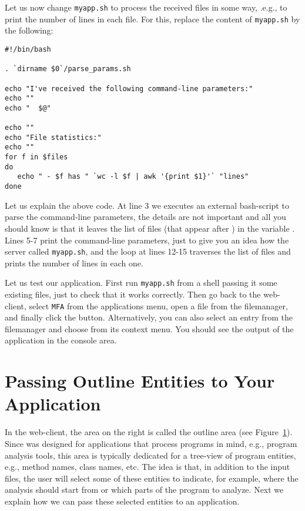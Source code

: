 Let us now change \texttt{myapp.sh} to process the received files in
some way, .e.g., to print the number of lines in each file. For this,
replace the content of \texttt{myapp.sh} by the following:

\medskip
\begin{lstlisting}[style=script]
#!/bin/bash

. `dirname $0`/parse_params.sh

echo "I've received the following command-line parameters:"
echo ""
echo "  $@"

echo ""
echo "File statistics:"
echo ""
for f in $files 
do
   echo " - $f has " `wc -l $f | awk '{print $1}'` "lines"
done
\end{lstlisting}

\medskip
\noindent
Let us explain the above code. 
%
At line 3 we executes an external bash-script to parse the
command-line parameters, the details are not important and all you
should know is that it leaves the list of files (that appear after
) in the variable .
%
Lines 5-7 print the command-line parameters, just to give you an idea
how the server called \texttt{myapp.sh}, and the loop at lines 12-15
traverses the list of files and prints the number of lines in each
one.

Let us test our application. First run \texttt{myapp.sh} from a shell
passing it some existing files, just to check that it works correctly.
%
Then go back to the web-client, select \texttt{MFA} from the
applications menu, open a file from the filemanager, and finally click
the \applybutton button. Alternatively, you can also select an entry
from the filemanager and choose \applybutton from its context
menu. You should see the output of the application in the console
area.

\section{Passing Outline Entities to Your Application}

In the web-client, the area on the right is called the outline area
(see Figure~\ref{}).
%
Since \ei was designed for applications that process programs in mind,
e.g., program analysis tools, this area is typically dedicated for a
tree-view of program entities, e.g., method names, class names,
etc. 
%
The idea is that, in addition to the input files, the user will select
some of these entities to indicate, for example, where the analysis
should start from or which parts of the program to analyze.
%
Next we explain how we can pass these selected entities to an
application.

